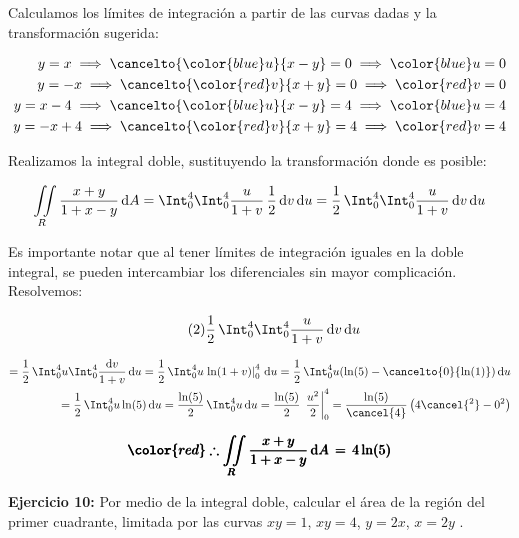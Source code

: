 \documentclass[12pt]{article}
\begin{document}
\noindent Calculamos los límites de integración a partir de las curvas dadas y la transformación sugerida:

\begin{align*}
	y = x  \implies \cancelto{{\color{blue}u}}{x-y} = 0 \implies {\color{blue}u} = 0 \\
	y = -x \implies \cancelto{{\color{red}v}}{x+y} = 0 \implies {\color{red}v} = 0 \\
	y = x - 4 \implies \cancelto{{\color{blue}u}}{x-y} = 4 \implies {\color{blue}u} = 4 \\
	y = -x + 4 \implies \cancelto{{\color{red}v}}{x+y} = 4 \implies {\color{red}v} = 4 \\
\end{align*}

\noindent Realizamos la integral doble, sustituyendo la transformación donde es posible:

\begin{equation*}
	 \iint\limits_R \frac{x+y}{1+x-y}\, \mathrm{d}A = \Int_0^4\Int_0^4 \frac{u}{1+v}\, \frac{1}{2}\,\mathrm{d}v\,\mathrm{d}u = \frac{1}{2}\,\Int_0^4\Int_0^4 \frac{u}{1+v}\, \mathrm{d}v\,\mathrm{d}u 
\end{equation*}

\noindent Es importante notar que al tener límites de integración iguales en la doble integral, se pueden intercambiar los diferenciales sin mayor complicación. Resolvemos:

\begin{equation}\label{eqn:9-2}\tag{2}
	\frac{1}{2}\,\Int_0^4\Int_0^4 \frac{u}{1+v}\, \mathrm{d}v\,\mathrm{d}u
\end{equation}

\begin{align*}
	= \frac{1}{2}\,\Int_0^4 u \Int_0^4 \frac{\mathrm{d}v}{1+v}\, \mathrm{d}u
	= \frac{1}{2}\,\Int_0^4 u \left.\ln(1+v)\right|_0^4\, \mathrm{d}u = \frac{1}{2}\,\Int_0^4 u( \ln(5)-\cancelto{0}{\ln(1)})\, \mathrm{d}u \\
	= \frac{1}{2}\,\Int_0^4 u \ln(5)\, \mathrm{d}u = \frac{\ln(5)}{2}\,\Int_0^4 u\, \mathrm{d}u = \frac{\ln(5)}{2}\, \left.\frac{u^2}{2}\right|_0^4 = \frac{\ln(5)}{\cancel{4}}\left(4\cancel{^2}-0^2\right)
\end{align*}

\begin{align*}
	\pmb{\color{red} \therefore \iint\limits_R \frac{x+y}{1+x-y}\, \mathrm{d}A\, = \,4\ln(5)}
\end{align*}

\noindent \textbf{Ejercicio 10:} Por medio de la integral doble, calcular el área de la 
región del primer cuadrante, limitada por las curvas $xy = 1$, $xy = 4$, $y = 2x$, $x = 2y$ .
\end{document}
